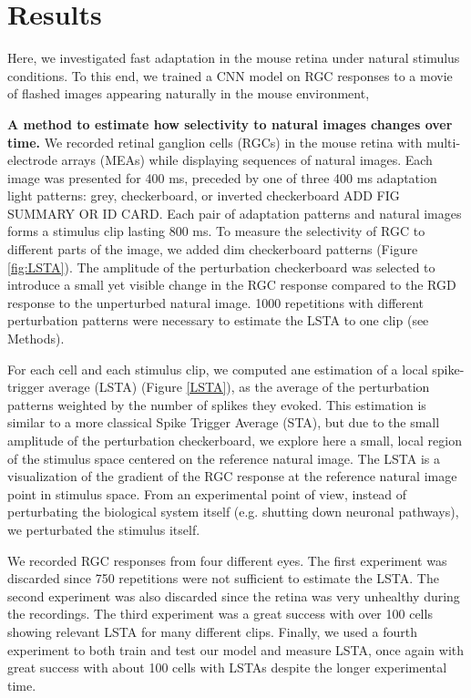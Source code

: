 \section{Results}
\label{sec:results}

Here, we investigated fast adaptation in the mouse retina under natural
stimulus conditions. To this end, we trained a CNN model on RGC responses to a
movie of flashed images appearing naturally in the mouse environment, %

\textbf{A method to estimate how selectivity to natural images changes over time.}
We recorded retinal ganglion cells (RGCs) in the mouse retina with multi-electrode arrays (MEAs) while displaying sequences of natural images.
Each image was presented for 400 ms, preceded by one of three 400 ms adaptation light patterns: grey, checkerboard, or inverted checkerboard ADD FIG SUMMARY OR ID CARD.
Each pair of adaptation patterns and natural images forms a stimulus clip lasting 800 ms.
To measure the selectivity of RGC to different parts of the image, we added dim checkerboard patterns (Figure \ref{fig:LSTA}).
The amplitude of the perturbation checkerboard was selected to introduce a small yet visible change in the RGC response compared to the RGD response to the unperturbed natural image.
1000 repetitions with different perturbation patterns were necessary to estimate the LSTA to one clip (see Methods).

For each cell and each stimulus clip, we computed ane estimation of a local
spike-trigger average (LSTA) (Figure \ref{LSTA}), as the average of the
perturbation patterns weighted by the number of splikes they evoked. This
estimation is similar to a more classical Spike Trigger Average (STA), but due
to the small amplitude of the perturbation checkerboard, we explore here a
small, local region of the stimulus space centered on the reference natural
image. The LSTA is a visualization of the gradient of the RGC response at the
reference natural image point in stimulus space. From an experimental point of
view, instead of perturbating the biological system itself (e.g. shutting down
neuronal pathways), we perturbated the stimulus itself.

We recorded RGC responses from four different eyes. The first experiment was
discarded since 750 repetitions were not sufficient to estimate the LSTA. The
second experiment was also discarded since the retina was very unhealthy during
the recordings. The third experiment was a great success with over 100 cells
showing relevant LSTA for many different clips. Finally, we used a fourth
experiment to both train and test our model and measure LSTA, once again with
great success with about 100 cells with LSTAs despite the longer experimental
time.


